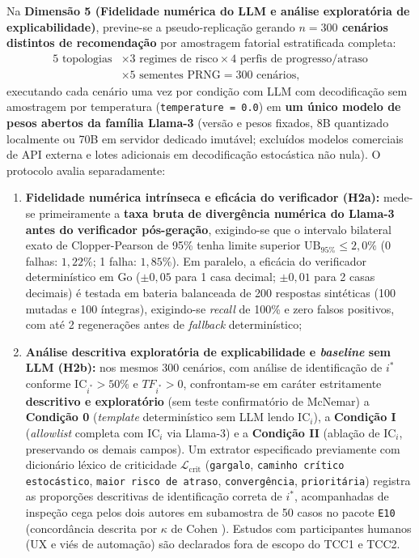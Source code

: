\documentclass[12pt,openany,oneside,a4paper,english,brazilian,sumario=tradicional]{abntex2}
\newcommand{\IC}{\mathrm{IC}}
\begin{document}
Na \textbf{Dimensão 5 (Fidelidade numérica do LLM e análise exploratória de explicabilidade)}, previne-se a pseudo-replicação gerando \textbf{$n=300$ cenários distintos de recomendação} por amostragem fatorial estratificada completa:
\begin{equation}
\begin{aligned}
5\text{ topologias} &\times 3\text{ regimes de risco} \times 4\text{ perfis de progresso/atraso} \\
&\times 5\text{ sementes PRNG} = 300\text{ cenários},
\end{aligned}
\end{equation}
executando cada cenário uma vez por condição com LLM com decodificação sem amostragem por temperatura (\texttt{temperature = 0.0}) em \textbf{um único modelo de pesos abertos da família Llama-3} (versão e pesos fixados, 8B quantizado localmente ou 70B em servidor dedicado imutável; excluídos modelos comerciais de API externa e lotes adicionais em decodificação estocástica não nula). O protocolo avalia separadamente:
\begin{enumerate}
  \item \textbf{Fidelidade numérica intrínseca e eficácia do verificador (H2a):} mede-se primeiramente a \textbf{taxa bruta de divergência numérica do Llama-3 antes do verificador pós-geração}, exigindo-se que o intervalo bilateral exato de Clopper-Pearson \cite{clopper1934} de 95\% tenha limite superior $\mathrm{UB}_{95\%} \le 2{,}0\%$ (0 falhas: $1{,}22\%$; 1 falha: $1{,}85\%$). Em paralelo, a eficácia do verificador determinístico em Go ($\pm 0{,}05$ para 1 casa decimal; $\pm 0{,}01$ para 2 casas decimais) é testada em bateria balanceada de 200 respostas sintéticas (100 mutadas e 100 íntegras), exigindo-se \textit{recall} de 100\% e zero falsos positivos, com até 2 regenerações antes de \textit{fallback} determinístico;
  \item \textbf{Análise descritiva exploratória de explicabilidade e \textit{baseline} sem LLM (H2b):} nos mesmos 300 cenários, com análise de identificação de $i^*$ conforme $\IC_{i^*}>50\%$ e $TF_{i^*}>0$, confrontam-se em caráter estritamente \textbf{descritivo e exploratório} (sem teste confirmatório de McNemar) a \textbf{Condição 0} (\textit{template} determinístico sem LLM lendo $\IC_i$), a \textbf{Condição I} (\textit{allowlist} completa com $\IC_i$ via Llama-3) e a \textbf{Condição II} (ablação de $\IC_i$, preservando os demais campos). Um extrator especificado previamente com dicionário léxico de criticidade $\mathcal{L}_{\text{crit}}$ (\texttt{gargalo}, \texttt{caminho crítico estocástico}, \texttt{maior risco de atraso}, \texttt{convergência}, \texttt{prioritária}) registra as proporções descritivas de identificação correta de $i^*$, acompanhadas de inspeção cega pelos dois autores em subamostra de 50 casos no pacote \texttt{E10} (concordância descrita por $\kappa$ de Cohen \cite{cohen1960}). Estudos com participantes humanos (UX e viés de automação) são declarados fora de escopo do TCC1 e TCC2.
\end{enumerate}
\end{document}
